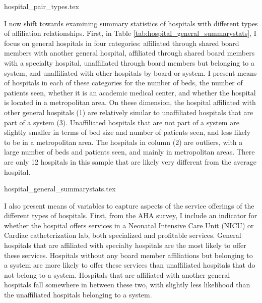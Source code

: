 \documentclass[12pt]{article}
\begin{document}
    {hospital_pair_types.tex}

    I now shift towards examining summary statistics of hospitals with different types of affiliation relationships. First, in Table \ref{tab:hospital_general_summarystats}, I focus on general hospitals in four categories: affiliated through shared board members with another general hospital, affiliated through shared board members with a specialty hospital, unaffiliated through board members but belonging to a system, and unaffiliated with other hospitals by board or system. I present means of hospitals in each of these categories for the number of beds, the number of patients seen, whether it is an academic medical center, and whether the hospital is located in a metropolitan area. On these dimension, the hospital affiliated with other general hospitals (1) are relatively similar to unaffiliated hospitals that are part of a system (3). Unaffiliated hospitals that are not part of a system are slightly smaller in terms of bed size and number of patients seen, and less likely to be in a metropolitan area. The hospitals in column (2) are outliers, with a large number of beds and patients seen, and mainly in metropolitan areas. There are only 12 hospitals in this sample that are likely very different from the average hospital. 

    {hospital_general_summarystats.tex}

    I also present means of variables to capture aspects of the service offerings of the different types of hospitals. First, from the AHA survey, I include an indicator for whether the hospital offers services in a Neonatal Intensive Care Unit (NICU) or Cardiac catheterization lab, both specialized and profitable services. General hospitals that are affiliated with specialty hospitals are the most likely to offer these services. Hospitals without any board member affiliations but belonging to a system are more likely to offer these services than unaffiliated hospitals that do not belong to a system. Hospitals that are affiliated with another general hospitals fall somewhere in between these two, with slightly less likelihood than the unaffiliated hospitals belonging to a system. 
\end{document}
